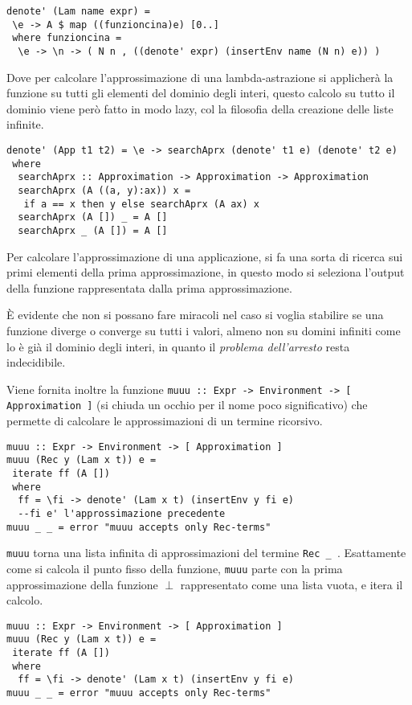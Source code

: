 \documentclass{article}
\begin{document}
\begin{verbatim}
denote' (Lam name expr) = 
 \e -> A $ map ((funzioncina)e) [0..]
 where funzioncina = 
  \e -> \n -> ( N n , ((denote' expr) (insertEnv name (N n) e)) )
\end{verbatim}

Dove per calcolare l'approssimazione di una lambda-astrazione si applicherà la funzione su tutti gli elementi del dominio degli interi, questo calcolo su tutto il dominio viene però fatto in modo lazy, col la filosofia della creazione delle liste infinite.

\begin{verbatim}
denote' (App t1 t2) = \e -> searchAprx (denote' t1 e) (denote' t2 e)
 where
  searchAprx :: Approximation -> Approximation -> Approximation
  searchAprx (A ((a, y):ax)) x =
   if a == x then y else searchAprx (A ax) x
  searchAprx (A []) _ = A []
  searchAprx _ (A []) = A []
\end{verbatim}

Per calcolare l'approssimazione di una applicazione, si fa una sorta di ricerca sui primi elementi della prima approssimazione, in questo modo si seleziona l'output della funzione rappresentata dalla prima approssimazione.

È evidente che non si possano fare miracoli nel caso si voglia stabilire se una funzione diverge o converge su tutti i valori, almeno non su domini infiniti come lo è già il dominio degli interi, in quanto il \emph{problema dell'arresto} resta indecidibile.

Viene fornita inoltre la funzione \texttt{muuu :: Expr -> Environment -> [ Approximation ]} (si chiuda un occhio per il nome poco significativo) che permette di calcolare le approssimazioni di un termine ricorsivo.

\begin{verbatim}
muuu :: Expr -> Environment -> [ Approximation ]
muuu (Rec y (Lam x t)) e =
 iterate ff (A [])
 where
  ff = \fi -> denote' (Lam x t) (insertEnv y fi e) 
  --fi e' l'approssimazione precedente
muuu _ _ = error "muuu accepts only Rec-terms"
\end{verbatim}

\texttt{muuu} torna una lista infinita di approssimazioni del termine \texttt{Rec \_ }. Esattamente come si calcola il punto fisso della funzione, \texttt{muuu} parte con la prima approssimazione della funzione $\perp$ rappresentato come una lista vuota, e itera il calcolo.

\begin{verbatim}
muuu :: Expr -> Environment -> [ Approximation ]
muuu (Rec y (Lam x t)) e =
 iterate ff (A [])
 where
  ff = \fi -> denote' (Lam x t) (insertEnv y fi e) 
muuu _ _ = error "muuu accepts only Rec-terms"
\end{verbatim}
\end{document}
